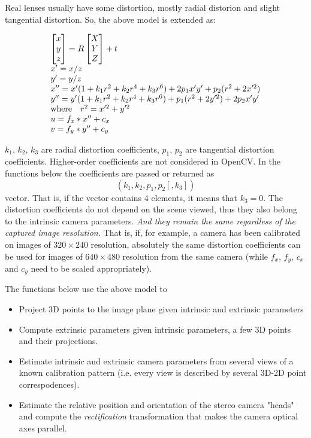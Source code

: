 Real lenses usually have some distortion, mostly
radial distorion and slight tangential distortion. So, the above model
is extended as:

\[
\begin{array}{l}
\begin{bmatrix} x\\ y\\ z \end{bmatrix} = R \begin{bmatrix} X\\ Y\\ Z \end{bmatrix} + t\\
x' = x/z\\
y' = y/z\\
x'' = x' (1 + k_1 r^2 + k_2 r^4 + k_3 r^6) + 2 p_1 x' y' + p_2(r^2 + 2 x'^2) \\
y'' = y' (1 + k_1 r^2 + k_2 r^4 + k_3 r^6) + p_1 (r^2 + 2 y'^2) + 2 p_2 x' y' \\
\text{where} \quad r^2 = x'^2 + y'^2 \\
u = f_x*x'' + c_x\\
v = f_y*y'' + c_y
\end{array}
\]

$k_1$, $k_2$, $k_3$ are radial distortion coefficients, $p_1$, $p_2$ are tangential distortion coefficients.
Higher-order coefficients are not considered in OpenCV. In the functions below the coefficients are passed or returned as
\[ (k_1, k_2, p_1, p_2[, k_3]) \]vector. That is, if the vector contains 4 elements, it means that $k_3=0$.
The distortion coefficients do not depend on the scene viewed, thus they also belong to the intrinsic camera parameters.
\emph{And they remain the same regardless of the captured image resolution.}
That is, if, for example, a camera has been calibrated on images of $320
\times 240$ resolution, absolutely the same distortion coefficients can
be used for images of $640 \times 480$ resolution from the same camera (while $f_x$,
$f_y$, $c_x$ and $c_y$ need to be scaled appropriately).

The functions below use the above model to

\begin{itemize}
 \item Project 3D points to the image plane given intrinsic and extrinsic parameters
 \item Compute extrinsic parameters given intrinsic parameters, a few 3D points and their projections.
 \item Estimate intrinsic and extrinsic camera parameters from several views of a known calibration pattern (i.e. every view is described by several 3D-2D point correspodences).
 \item Estimate the relative position and orientation of the stereo camera "heads" and compute the \emph{rectification} transformation that makes the camera optical axes parallel.
\end{itemize}

